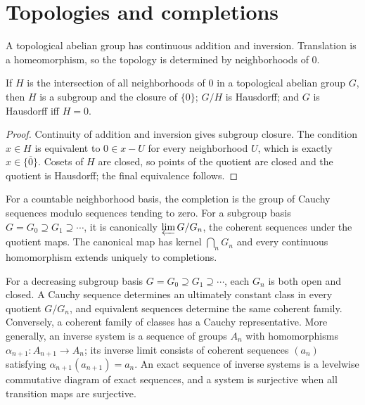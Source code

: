 \section{Topologies and completions}
\label{am-ch10-topology}
\uses{}
\begin{definition}
\label{am-def-topological-group}
\uses{}
A topological abelian group has continuous addition and inversion.  Translation
is a homeomorphism, so the topology is determined by neighborhoods of $0$.
\end{definition}
\begin{lemma}
\label{am-lem-10-1}
\uses{}
If $H$ is the intersection of all neighborhoods of $0$ in a topological abelian
group $G$, then $H$ is a subgroup and the closure of $\{0\}$; $G/H$ is
Hausdorff; and $G$ is Hausdorff iff $H=0$.
\end{lemma}
\begin{proof}
Continuity of addition and inversion gives subgroup closure.  The condition
$x\in H$ is equivalent to $0\in x-U$ for every neighborhood $U$, which is
exactly $x\in\overline{\{0\}}$.  Cosets of $H$ are closed, so points of the
quotient are closed and the quotient is Hausdorff; the final equivalence follows.
\end{proof}
\begin{definition}
\label{am-def-completion}
\uses{}
For a countable neighborhood basis, the completion is the group of Cauchy
sequences modulo sequences tending to zero.  For a subgroup basis
$G=G_0\supseteq G_1\supseteq\cdots$, it is canonically
$\varprojlim G/G_n$, the coherent sequences under the quotient maps.  The
canonical map has kernel $\bigcap_nG_n$ and every continuous homomorphism
extends uniquely to completions.
\end{definition}
\begin{definition}
\label{am-def-inverse-system}
\uses{}
For a decreasing subgroup basis $G=G_0\supseteq G_1\supseteq\cdots$, each
$G_n$ is both open and closed.  A Cauchy sequence determines an ultimately
constant class in every quotient $G/G_n$, and equivalent sequences determine
the same coherent family.  Conversely, a coherent family of classes has a
Cauchy representative.  More generally, an inverse system is a sequence of
groups $A_n$ with homomorphisms $\alpha_{n+1}:A_{n+1}\to A_n$; its inverse
limit consists of coherent sequences $(a_n)$ satisfying
$\alpha_{n+1}(a_{n+1})=a_n$.  An exact sequence of inverse systems is a
levelwise commutative diagram of exact sequences, and a system is surjective
when all transition maps are surjective.
\end{definition}
